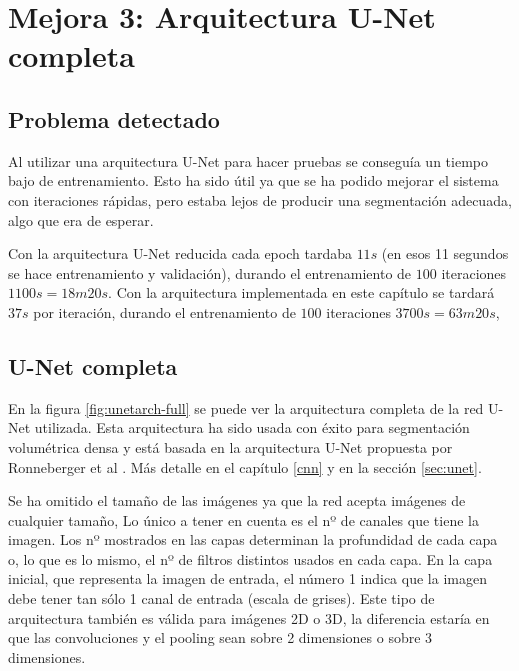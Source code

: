 \chapter{Mejora 3: Arquitectura U-Net completa}\label{full_unet}

\section{Problema detectado}\label{sec:full_unet_problem}

Al utilizar una arquitectura U-Net para hacer pruebas se conseguía un tiempo bajo de entrenamiento. Esto ha sido útil ya que se ha podido mejorar el sistema con iteraciones rápidas, pero estaba lejos de producir una segmentación adecuada, algo que era de esperar.

Con la arquitectura U-Net reducida cada epoch tardaba $11s$ (en esos 11 segundos se hace entrenamiento y validación), durando el entrenamiento de $100$ iteraciones $1100s = 18m20s$. Con la arquitectura implementada en este capítulo se tardará $37s$ por iteración, durando el entrenamiento de $100$ iteraciones $3700s = 63m20s$, 

\section{U-Net completa}\label{sec:full_unet_change}

En la figura \ref{fig:unetarch-full} se puede ver la arquitectura completa de la red U-Net utilizada. Esta arquitectura ha sido usada con éxito para segmentación volumétrica densa \cite{Cicek2016} y está basada en la arquitectura U-Net propuesta por Ronneberger et al \cite{Ronneberger2015}. Más detalle en el capítulo \ref{cnn} y en la sección \ref{sec:unet}.

Se ha omitido el tamaño de las imágenes ya que la red acepta imágenes de cualquier tamaño, Lo único a tener en cuenta es el nº de canales que tiene la imagen. Los nº mostrados en las capas determinan la profundidad de cada capa o, lo que es lo mismo, el nº de filtros distintos usados en cada capa. En la capa inicial, que representa la imagen de entrada, el número 1 indica que la imagen debe tener tan sólo 1 canal de entrada (escala de grises). Este tipo de arquitectura también es válida para imágenes 2D o 3D, la diferencia estaría en que las convoluciones y el pooling sean sobre 2 dimensiones o sobre 3 dimensiones.


